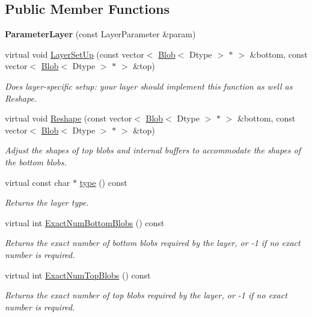 \subsection*{Public Member Functions}
\begin{DoxyCompactItemize}
\item 
{\bfseries Parameter\+Layer} (const Layer\+Parameter \&param)\hypertarget{classcaffe_1_1ParameterLayer_aa7a7ec773a60762eb7c3da447fae4e56}{}\label{classcaffe_1_1ParameterLayer_aa7a7ec773a60762eb7c3da447fae4e56}

\item 
virtual void \hyperlink{classcaffe_1_1ParameterLayer_aaea039fd88afae2d0976e00635d28980}{Layer\+Set\+Up} (const vector$<$ \hyperlink{classcaffe_1_1Blob}{Blob}$<$ Dtype $>$ $\ast$ $>$ \&bottom, const vector$<$ \hyperlink{classcaffe_1_1Blob}{Blob}$<$ Dtype $>$ $\ast$ $>$ \&top)
\begin{DoxyCompactList}\small\item\em Does layer-\/specific setup\+: your layer should implement this function as well as Reshape. \end{DoxyCompactList}\item 
virtual void \hyperlink{classcaffe_1_1ParameterLayer_a5a239ccb2a4048b24caa72c89b7a0708}{Reshape} (const vector$<$ \hyperlink{classcaffe_1_1Blob}{Blob}$<$ Dtype $>$ $\ast$ $>$ \&bottom, const vector$<$ \hyperlink{classcaffe_1_1Blob}{Blob}$<$ Dtype $>$ $\ast$ $>$ \&top)
\begin{DoxyCompactList}\small\item\em Adjust the shapes of top blobs and internal buffers to accommodate the shapes of the bottom blobs. \end{DoxyCompactList}\item 
virtual const char $\ast$ \hyperlink{classcaffe_1_1ParameterLayer_a034c03b574dc10a7cd3b7b0df18bd8a3}{type} () const \hypertarget{classcaffe_1_1ParameterLayer_a034c03b574dc10a7cd3b7b0df18bd8a3}{}\label{classcaffe_1_1ParameterLayer_a034c03b574dc10a7cd3b7b0df18bd8a3}

\begin{DoxyCompactList}\small\item\em Returns the layer type. \end{DoxyCompactList}\item 
virtual int \hyperlink{classcaffe_1_1ParameterLayer_ae1150a72fa6add67511d92da2cb8216a}{Exact\+Num\+Bottom\+Blobs} () const 
\begin{DoxyCompactList}\small\item\em Returns the exact number of bottom blobs required by the layer, or -\/1 if no exact number is required. \end{DoxyCompactList}\item 
virtual int \hyperlink{classcaffe_1_1ParameterLayer_a7db6cdb07222be5b9eb462c0ac64b363}{Exact\+Num\+Top\+Blobs} () const 
\begin{DoxyCompactList}\small\item\em Returns the exact number of top blobs required by the layer, or -\/1 if no exact number is required. \end{DoxyCompactList}\end{DoxyCompactItemize}
